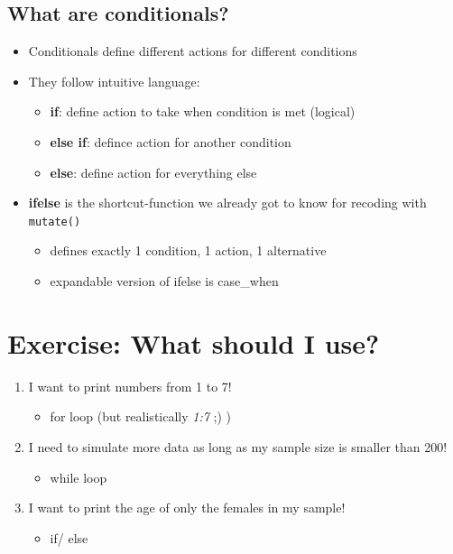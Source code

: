 \documentclass[
]{book}
\providecommand{\tightlist}{%
  \setlength{\itemsep}{0pt}\setlength{\parskip}{0pt}}
\begin{document}
\subsection{What are conditionals?}\label{what-are-conditionals}

\begin{itemize}
\tightlist
\item
  Conditionals define different actions for different conditions
\item
  They follow intuitive language:

  \begin{itemize}
  \tightlist
  \item
    \textbf{if}: define action to take when condition is met (logical)
  \item
    \textbf{else if}: defince action for another condition
  \item
    \textbf{else}: define action for everything else
  \end{itemize}
\item
  \textbf{ifelse} is the shortcut-function we already got to know for recoding with \texttt{mutate()}

  \begin{itemize}
  \tightlist
  \item
    defines exactly 1 condition, 1 action, 1 alternative
  \item
    expandable version of ifelse is case\_when
  \end{itemize}
\end{itemize}

\section{Exercise: What should I use?}\label{exercise-what-should-i-use}

\begin{enumerate}
\def\labelenumi{\arabic{enumi}.}
\tightlist
\item
  I want to print numbers from 1 to 7!

  \begin{itemize}
  \tightlist
  \item
    for loop (but realistically \emph{1:7} ;) )
  \end{itemize}
\item
  I need to simulate more data as long as my sample size is smaller than 200!

  \begin{itemize}
  \tightlist
  \item
    while loop
  \end{itemize}
\item
  I want to print the age of only the females in my sample!

  \begin{itemize}
  \tightlist
  \item
    if/ else
  \end{itemize}
\end{enumerate}
\end{document}
